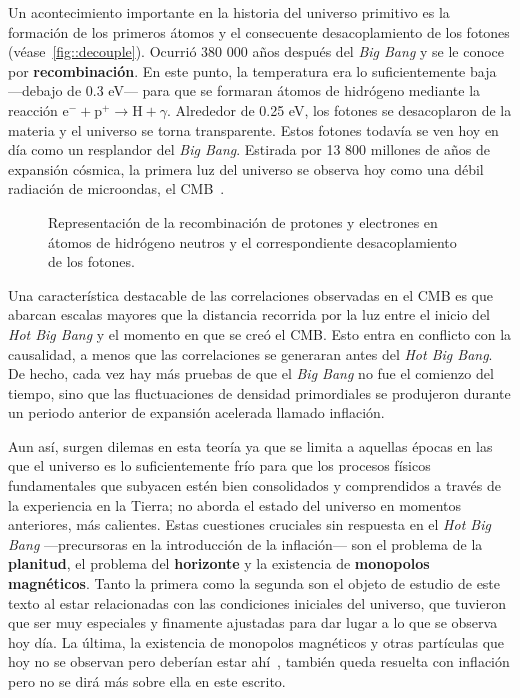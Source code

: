 Un acontecimiento importante en la historia del universo primitivo es la formación de los primeros átomos y el consecuente desacoplamiento de los fotones (véase~\autoref{fig::decouple}). Ocurrió 380 000 años después del \textit{Big Bang} y se le conoce por \textbf{recombinación}. En este punto, la temperatura era lo suficientemente baja ---debajo de 0.3 eV--- para que se formaran átomos de hidrógeno mediante la reacción \(\mathrm{e^{-}}+\mathrm{p^+}\rightarrow \mathrm{H}+\gamma\). Alrededor de 0.25 eV, los fotones se desacoplaron de la materia y el universo se torna transparente. Estos fotones todavía se ven hoy en día como un resplandor del \textit{Big Bang}. Estirada por 13 800 millones de años de expansión cósmica, la primera luz del universo se observa hoy como una débil radiación de microondas, el CMB~\cite{penzias1965measurement}.
\begin{figure}[b]
    \centering
    \def\svgwidth{0.8\textwidth}
    
    \caption[Representación de la recombinación de protones y electrones]{Representación de la recombinación de protones y electrones en átomos de hidrógeno neutros y el correspondiente desacoplamiento de los fotones.}
    \label{fig::decouple}
\end{figure}

Una característica destacable de las correlaciones observadas en el CMB es que abarcan escalas mayores que la distancia recorrida por la luz entre el inicio del \textit{Hot Big Bang} y el momento en que se creó el CMB. Esto entra en conflicto con la causalidad, a menos que las correlaciones se generaran antes del \textit{Hot Big Bang}. De hecho, cada vez hay más pruebas de que el \textit{Big Bang} no fue el comienzo del tiempo, sino que las fluctuaciones de densidad primordiales se produjeron durante un periodo anterior de expansión acelerada llamado inflación.

Aun así, surgen dilemas en esta teoría ya que se limita a aquellas épocas en las que el universo es lo suficientemente frío para que los procesos físicos fundamentales que subyacen estén bien consolidados y comprendidos a través de la experiencia en la Tierra; no aborda el estado del universo en momentos anteriores, más calientes. Estas cuestiones cruciales sin respuesta en el \textit{Hot Big Bang} ---precursoras en la introducción de la inflación--- son el problema de la \textbf{planitud}, el problema del \textbf{horizonte} y la existencia de \textbf{monopolos magnéticos}. Tanto la primera como la segunda son el objeto de estudio de este texto al estar relacionadas con las condiciones iniciales del universo, que tuvieron que ser muy especiales y finamente ajustadas para dar lugar a lo que se observa hoy día. La última, la existencia de monopolos magnéticos y otras partículas que hoy no se observan pero deberían estar ahí~\cite{liddle1998introduction}, también queda resuelta con inflación pero no se dirá más sobre ella en este escrito.

